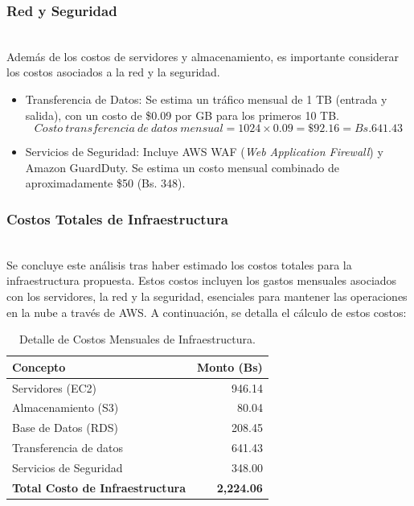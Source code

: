 \subsubsection{Red y Seguridad}\hfill\\ 
\indent
Además de los costos de servidores y almacenamiento, es importante considerar los costos asociados a la red y la seguridad.

\begin{itemize}[noitemsep,topsep=0pt,parsep=0pt,partopsep=0pt]
\item Transferencia de Datos: Se estima un tráfico mensual de 1 TB (entrada y salida), con un costo de \$0.09 por GB para los primeros 10 TB.
\begin{equation*}\label{eq_transf_datos}
Costo\ transferencia\ de\ datos\ mensual = 1024 \times 0.09 = \$92.16 = Bs.641.43
\end{equation*}
\item Servicios de Seguridad: Incluye AWS WAF (\textit{Web Application Firewall}) y Amazon GuardDuty. Se estima un costo mensual combinado de aproximadamente \$50 (Bs. 348).
\end{itemize}

\subsubsection{Costos Totales de Infraestructura}\hfill\\ 
\indent
Se concluye este análisis tras haber estimado los costos totales para la infraestructura propuesta. Estos costos incluyen los gastos mensuales asociados con los servidores, la red y la seguridad, esenciales para mantener las operaciones en la nube a través de AWS. A continuación, se detalla el cálculo de estos costos:

\begin{table}[ht]
    \caption{Detalle de Costos Mensuales de Infraestructura.}
    \label{tab:costos_infraestructura}
    \centering
    \begin{tabularx}{\textwidth}{|X|r|} 
        \hline
        \textbf{Concepto} & \textbf{Monto (Bs)} \\ \hline
        Servidores (EC2) & 946.14 \\ 
        Almacenamiento (S3) & 80.04 \\ 
        Base de Datos (RDS) & 208.45 \\ 
        Transferencia de datos & 641.43 \\ 
        Servicios de Seguridad & 348.00 \\ \hline
        \textbf{Total Costo de Infraestructura} & \textbf{2,224.06} \\ \hline
    \end{tabularx}
\end{table}

